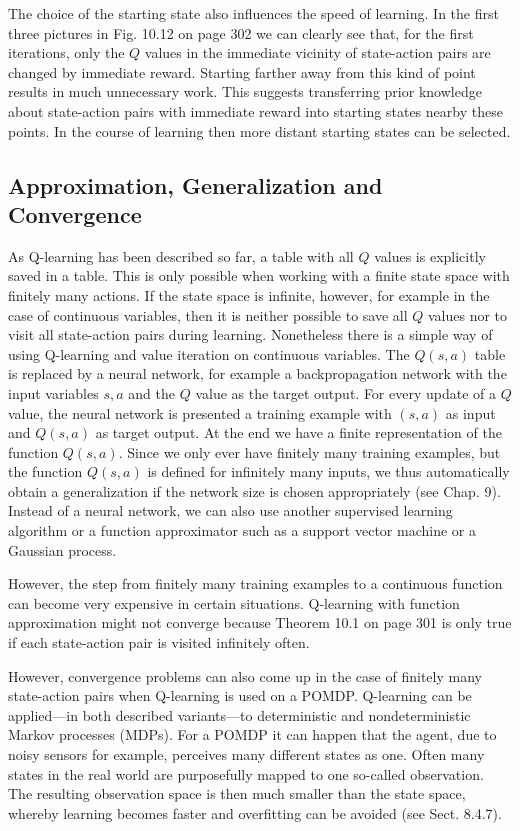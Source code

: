 \documentclass[10pt]{book}
\begin{document}
The choice of the starting state also influences the speed of learning. In the first three pictures in Fig. 10.12 on page 302 we can clearly see that, for the first iterations, only the $Q$ values in the immediate vicinity of state-action pairs are changed by immediate reward. Starting farther away from this kind of point results in much unnecessary work. This suggests transferring prior knowledge about state-action pairs with immediate reward into starting states nearby these points. In the course of learning then more distant starting states can be selected.

\subsection{Approximation, Generalization and Convergence}
As Q-learning has been described so far, a table with all $Q$ values is explicitly saved in a table. This is only possible when working with a finite state space with finitely many actions. If the state space is infinite, however, for example in the case of continuous variables, then it is neither possible to save all $Q$ values nor to visit all state-action pairs during learning.
Nonetheless there is a simple way of using Q-learning and value iteration on continuous variables. The $Q(s, a)$ table is replaced by a neural network, for example a backpropagation network with the input variables $s, a$ and the $Q$ value as the target output. For every update of a $Q$ value, the neural network is presented a training example with $(s, a)$ as input and $Q(s, a)$ as target output. At the end we have a finite representation of the function $Q(s, a)$. Since we only ever have finitely many training examples, but the function $Q(s, a)$ is defined for infinitely many inputs, we thus automatically obtain a generalization if the network size is chosen appropriately (see Chap. 9). Instead of a neural network, we can also use another supervised learning algorithm or a function approximator such as a support vector machine or a Gaussian process.

However, the step from finitely many training examples to a continuous function can become very expensive in certain situations. Q-learning with function approximation might not converge because Theorem 10.1 on page 301 is only true if each state-action pair is visited infinitely often.

However, convergence problems can also come up in the case of finitely many state-action pairs when Q-learning is used on a POMDP. Q-learning can be applied—in both described variants—to deterministic and nondeterministic Markov processes (MDPs). For a POMDP it can happen that the agent, due to noisy sensors for example, perceives many different states as one. Often many states in the real world are purposefully mapped to one so-called observation. The resulting observation space is then much smaller than the state space, whereby learning becomes faster and overfitting can be avoided (see Sect. 8.4.7).
\end{document}

